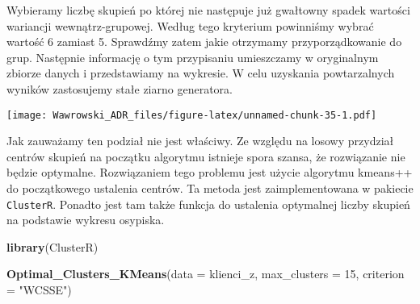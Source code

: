 \documentclass[]{book}
\newenvironment{Shaded}{\begin{snugshade}}{\end{snugshade}}
\newcommand{\KeywordTok}[1]{\textcolor[rgb]{0.13,0.29,0.53}{\textbf{#1}}}
\newcommand{\DataTypeTok}[1]{\textcolor[rgb]{0.13,0.29,0.53}{#1}}
\newcommand{\DecValTok}[1]{\textcolor[rgb]{0.00,0.00,0.81}{#1}}
\newcommand{\StringTok}[1]{\textcolor[rgb]{0.31,0.60,0.02}{#1}}
\newcommand{\OperatorTok}[1]{\textcolor[rgb]{0.81,0.36,0.00}{\textbf{#1}}}
\newcommand{\NormalTok}[1]{#1}
\begin{document}
Wybieramy liczbę skupień po której nie następuje już gwałtowny spadek
wartości wariancji wewnątrz-grupowej. Według tego kryterium powinniśmy
wybrać wartość 6 zamiast 5. Sprawdźmy zatem jakie otrzymamy
przyporządkowanie do grup. Następnie informację o tym przypisaniu
umieszczamy w oryginalnym zbiorze danych i przedstawiamy na wykresie. W
celu uzyskania powtarzalnych wyników zastosujemy stałe ziarno
generatora.

\begin{Shaded}
\end{Shaded}

\texttt{[image: Wawrowski\_ADR\_files/figure-latex/unnamed-chunk-35-1.pdf]}

Jak zauważamy ten podział nie jest właściwy. Ze względu na losowy
przydział centrów skupień na początku algorytmu istnieje spora szansa,
że rozwiązanie nie będzie optymalne. Rozwiązaniem tego problemu jest
użycie algorytmu kmeans++ do początkowego ustalenia centrów. Ta metoda
jest zaimplementowana w pakiecie \texttt{ClusterR}. Ponadto jest tam
także funkcja do ustalenia optymalnej liczby skupień na podstawie
wykresu osypiska.

\begin{Shaded}
\begin{Highlighting}[]
\KeywordTok{library}\NormalTok{(ClusterR)}

\KeywordTok{Optimal_Clusters_KMeans}\NormalTok{(}\DataTypeTok{data =}\NormalTok{ klienci_z, }\DataTypeTok{max_clusters =} \DecValTok{15}\NormalTok{, }\DataTypeTok{criterion =} \StringTok{"WCSSE"}\NormalTok{)}
\end{Highlighting}
\end{Shaded}
\end{document}
